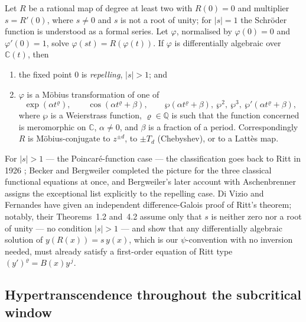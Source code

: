\begin{theorem}
\label{a:thm:BB}
Let $R$ be a rational map of degree at least two with $R(0)=0$ and multiplier
$s = R'(0)$, where $s\neq0$ and $s$ is not a root of unity; for $|s|=1$ the
Schröder function is understood as a formal series. Let $\varphi$, normalised by
$\varphi(0)=0$ and $\varphi'(0)=1$, solve $\varphi(st) = R(\varphi(t))$. If
$\varphi$ is differentially algebraic over $\mathbb C(t)$, then
\begin{enumerate}[label=\textup{(\roman*)}]
\item the fixed point $0$ is \emph{repelling}, $|s|>1$; and
\item $\varphi$ is a Möbius transformation of one of
\begin{equation*}
\exp(\alpha t^{\varrho}),
\qquad
\cos(\alpha t^{\varrho}+\beta),
\qquad
\wp(\alpha t^{\varrho}+\beta),\ \wp^{2},\ \wp^{3},\ \wp'(\alpha t^{\varrho}+\beta),
\end{equation*}
where $\wp$ is a Weierstrass function, $\varrho\in\mathbb Q$ is such that the
function concerned is meromorphic on $\mathbb C$, $\alpha\neq0$, and $\beta$ is a
fraction of a period. Correspondingly $R$ is Möbius-conjugate to $z^{\pm d}$, to
$\pm T_d$ (Chebyshev), or to a Lattès map.
\end{enumerate}
\end{theorem}

\begin{remark}
\label{a:rem:lineage}
For $|s|>1$ --- the Poincaré-function case --- the classification goes back to Ritt
in 1926 \cite{Ritt1926}; Becker and Bergweiler completed the picture for the three
classical functional equations at once, and Bergweiler's later account with
Aschenbrenner \cite{AschenbrennerBergweiler2015} assigns the exceptional list
explicitly to the repelling case. Di Vizio and Fernandes
\cite{DiVizioFernandes2021} have given an independent difference-Galois proof of
Ritt's theorem; notably, their Theorems~1.2 and~4.2 assume only that $s$ is neither
zero nor a root of unity --- no condition $|s|>1$ --- and show that any
differentially algebraic solution of $y(R(x)) = s\,y(x)$, which is our
$\psi$-convention with no inversion needed, must already satisfy a first-order
equation of Ritt type $(y')^{\varrho} = B(x)y^{\,j}$.
\end{remark}

\subsection{Hypertranscendence throughout the subcritical window}
\label{a:sec:htmain}

